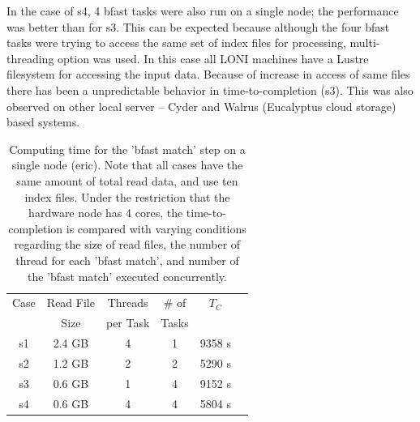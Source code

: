 \documentclass{cpeauth}
\begin{document}

In the case of s4, 4 bfast tasks were also run on a single node; the
performance was better than for s3. This can be expected because
although the four bfast tasks were trying to access the same set of
index files for processing, multi-threading option was used.  In this
case all LONI machines have a Lustre filesystem for accessing the
input data.  Because of increase in access of same files there has
been a unpredictable behavior in time-to-completion (s3). This was
also observed on other local server -- Cyder and Walrus (Eucalyptus
cloud storage) based systems.






 \begin{table}
 \small
 \begin{tabular}{|c|c|c|c|c|c|} 
 \hline 
Case & Read File  & Threads & \# of   & $T_C$ \\
& Size &  per Task &  Tasks &   \\  \hline
s1 & 2.4 GB &  4 & 1 & 9358 s \\
s2 & 1.2 GB & 2 & 2 & 5290 s \\
s3 & 0.6 GB & 1 & 4 & 9152 s \\ 
s4& 0.6 GB & 4 & 4 & 5804 s \\

 \hline
 \end{tabular}
 
 \caption{Computing time for the 'bfast match' step on a single node
   (eric). Note that all cases have the same amount of total read
   data, and use ten index files.  Under the restriction that the
   hardware node has 4 cores, the time-to-completion is compared with
   varying conditions regarding the size of read files, the number of
   thread for each 'bfast match', and number of the 'bfast match'
   executed concurrently.  }
    \label{table:understandio}
\end{table}
\end{document}
